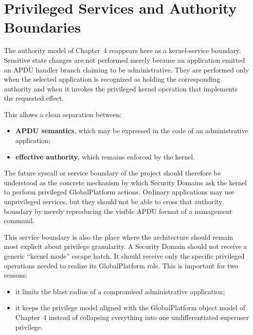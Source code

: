 \section{Privileged Services and Authority Boundaries}
\label{sec:system-authority-boundaries}


The authority model of Chapter~4 reappears here as a kernel-service
boundary. Sensitive state changes are not performed merely because an
application emitted an APDU handler branch claiming to be administrative.
They are performed only when the selected application is recognized as holding
the corresponding authority and when it invokes the privileged kernel
operation that implements the requested effect.

This allows a clean separation between:

\begin{itemize}
\item \textbf{APDU semantics}, which may be expressed in the code of an
  administrative application;
\item \textbf{effective authority}, which remains enforced by the kernel.
\end{itemize}

The future syscall or service boundary of the project should therefore be
understood as the concrete mechanism by which Security Domains ask the
kernel to perform privileged GlobalPlatform actions. Ordinary
applications may use unprivileged services, but they should not be able
to cross that authority boundary by merely reproducing the visible APDU
format of a management command.

This service boundary is also the place where the architecture should
remain most explicit about privilege granularity. A Security Domain
should not receive a generic ``kernel mode'' escape hatch. It should
receive only the specific privileged operations needed to realize its
GlobalPlatform role. This is important for two reasons:
\begin{itemize}
\item it limits the blast radius of a compromised administrative
  application;
\item it keeps the privilege model aligned with the GlobalPlatform object
  model of Chapter~4 instead of collapsing everything into one
  undifferentiated superuser privilege.
\end{itemize}

